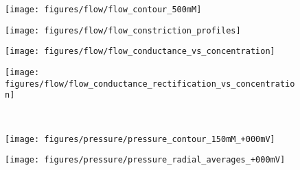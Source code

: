\documentclass[journal=ancac3,manuscript=article,etalmode=truncate,maxauthors=0,layout=onecolumn]{achemso}
\begin{document}
\begin{figure*}[!tbp]
  \centering
  \hspace{-2cm}
  \begin{minipage}[t]{5.5cm}
    \begin{subfigure}[t]{5.5cm}
      \centering
      \caption{}\vspace{-3mm}\label{fig:flow_contour}
      \texttt{[image: figures/flow/flow\_contour\_500mM]}
    \end{subfigure}
    \begin{subfigure}[t]{5.5cm}
      \vspace{3mm}
      \centering
      \caption{}\vspace{-3mm}\label{fig:flow_constriction_profiles}
      \texttt{[image: figures/flow/flow\_constriction\_profiles]}
    \end{subfigure}
  \end{minipage}
  \begin{minipage}[t]{10.5cm}
    \begin{subfigure}[t]{5cm}
      \centering
      \caption{}\vspace{-3mm}\label{fig:flow_conductance_vs_concentration}
      \texttt{[image: figures/flow/flow\_conductance\_vs\_concentration]}
    \end{subfigure}
    \begin{subfigure}[t]{5cm}
      \centering
      \caption{}\vspace{-3mm}\label{fig:flow_conductance_rectification_vs_concentration}
      \texttt{[image: figures/flow/flow\_conductance\_rectification\_vs\_concentration]}
    \end{subfigure}
    \\
    \begin{minipage}[t]{9cm}
      \hspace{1cm}
      \begin{subfigure}[t]{5.5cm}
        \centering
        \caption{}\vspace{-3mm}\label{fig:pressure_contour}
        \texttt{[image: figures/pressure/pressure\_contour\_150mM\_+000mV]}
      \end{subfigure}
      \hspace{-5mm}
      \begin{subfigure}[t]{2.5cm}
        \centering
        \caption{}\vspace{-3mm}\label{fig:pressure_radial_averages}
        \texttt{[image: figures/pressure/pressure\_radial\_averages\_+000mV]}
      \end{subfigure}
    \end{minipage}
  \end{minipage}
\centering


\end{figure*}
\end{document}
